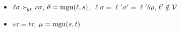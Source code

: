 
\begin{itemize}

    \item
        $\ell\sigma\mathrel\succ_{\!gr} r\sigma$,
        $\theta=\operatorname{mgu}(\ell,s)$,
        $\ell\sigma = \ell'\sigma' = \ell'\theta\rho$,
        $\ell'\notin\mathcal{V}$

    \item
        $s\tau = t\tau$,
        $\mu=\operatorname{mgu}(s,t)$
\end{itemize}